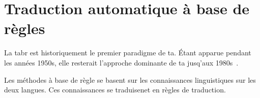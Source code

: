 \section{Traduction automatique à base de règles}
\label{sec:rbmt}

La \acrfull{tabr} est historiquement le premier paradigme de \acrshort{ta}. 
Étant apparue pendant les années 1950s, 
elle resterait l'approche dominante de \acrshort{ta} jusq'aux 1980s~\cite{routledge}.

Les méthodes à base de règle se basent sur les connaissances linguistiques sur les deux langues.
Ces connaissances se traduisenet en règles de traduction.
